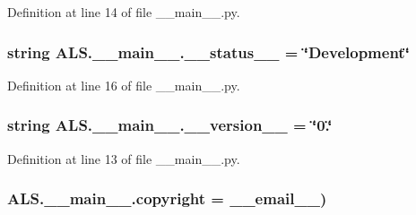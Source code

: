 Definition at line 14 of file \+\_\+\+\_\+main\+\_\+\+\_\+.\+py.

\hypertarget{namespace_a_l_s_1_1____main_____a6247bb85beb0771399c7ab617b11d74e}{
\subsubsection[{\+\_\+\+\_\+status\+\_\+\+\_\+}]{\setlength{\rightskip}{0pt plus 5cm}string A\+L\+S.\+\_\+\+\_\+main\+\_\+\+\_\+.\+\_\+\+\_\+status\+\_\+\+\_\+ = \char`\"{}Development\char`\"{}}}\label{namespace_a_l_s_1_1____main_____a6247bb85beb0771399c7ab617b11d74e}


Definition at line 16 of file \+\_\+\+\_\+main\+\_\+\+\_\+.\+py.

\hypertarget{namespace_a_l_s_1_1____main_____aff934e6ec8e8870ccc1356e92dd9f909}{
\subsubsection[{\+\_\+\+\_\+version\+\_\+\+\_\+}]{\setlength{\rightskip}{0pt plus 5cm}string A\+L\+S.\+\_\+\+\_\+main\+\_\+\+\_\+.\+\_\+\+\_\+version\+\_\+\+\_\+ = \char`\"{}0.\char`\"{}}}\label{namespace_a_l_s_1_1____main_____aff934e6ec8e8870ccc1356e92dd9f909}


Definition at line 13 of file \+\_\+\+\_\+main\+\_\+\+\_\+.\+py.

\hypertarget{namespace_a_l_s_1_1____main_____a3865f3dc40606d46564c911de0639778}{
\subsubsection[{copyright}]{\setlength{\rightskip}{0pt plus 5cm}A\+L\+S.\+\_\+\+\_\+main\+\_\+\+\_\+.\+copyright = {\bf \+\_\+\+\_\+email\+\_\+\+\_\+})}}\label{namespace_a_l_s_1_1____main_____a3865f3dc40606d46564c911de0639778}


